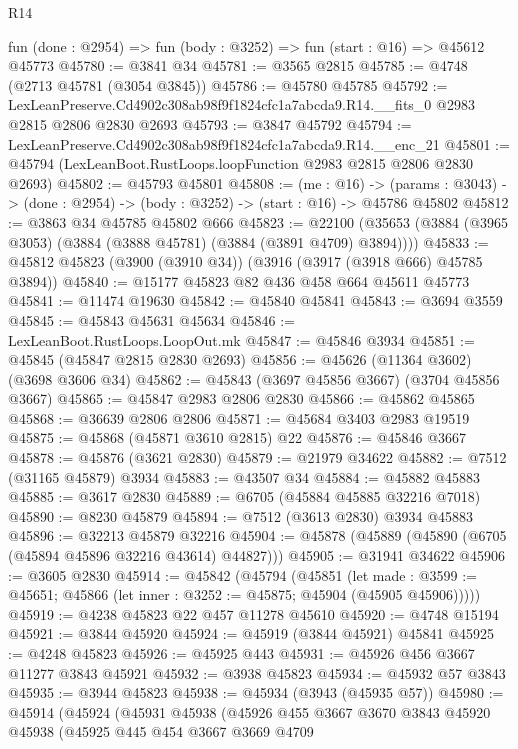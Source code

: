 \begin{lexlean}{R14}
\begin{coremodule}
  fun (done : @2954) => fun (body : @3252) => fun (start : @16) => @45612 @45773
@45780 := @3841 @34
@45781 := @3565 @2815
@45785 := @4748 (@2713 @45781 (@3054 @3845))
@45786 := @45780 @45785
@45792 := LexLeanPreserve.Cd4902c308ab98f9f1824cfc1a7abcda9.R14.__fits_0
    @2983
    @2815
    @2806
    @2830
    @2693
@45793 := @3847 @45792
@45794 := LexLeanPreserve.Cd4902c308ab98f9f1824cfc1a7abcda9.R14.__enc_21
@45801 := @45794 (LexLeanBoot.RustLoops.loopFunction @2983 @2815 @2806 @2830 @2693)
@45802 := @45793 @45801
@45808 := (me : @16) ->
  (params : @3043) -> (done : @2954) -> (body : @3252) -> (start : @16) -> @45786 @45802
@45812 := @3863 @34 @45785 @45802 @666
@45823 := @22100 (@35653 (@3884 (@3965 @3053) (@3884 (@3888 @45781) (@3884 (@3891 @4709) @3894))))
@45833 := @45812 @45823 (@3900 (@3910 @34)) (@3916 (@3917 (@3918 @666) @45785 @3894))
@45840 := @15177 @45823 @82 @436 @458 @664 @45611 @45773
@45841 := @11474 @19630
@45842 := @45840 @45841
@45843 := @3694 @3559
@45845 := @45843 @45631 @45634
@45846 := LexLeanBoot.RustLoops.LoopOut.mk
@45847 := @45846 @3934
@45851 := @45845 (@45847 @2815 @2830 @2693)
@45856 := @45626 (@11364 @3602) (@3698 @3606 @34)
@45862 := @45843 (@3697 @45856 @3667) (@3704 @45856 @3667)
@45865 := @45847 @2983 @2806 @2830
@45866 := @45862 @45865
@45868 := @36639 @2806 @2806
@45871 := @45684 @3403 @2983 @19519
@45875 := @45868 (@45871 @3610 @2815) @22
@45876 := @45846 @3667
@45878 := @45876 (@3621 @2830)
@45879 := @21979 @34622
@45882 := @7512 (@31165 @45879) @3934
@45883 := @43507 @34
@45884 := @45882 @45883
@45885 := @3617 @2830
@45889 := @6705 (@45884 @45885 @32216 @7018)
@45890 := @8230 @45879
@45894 := @7512 (@3613 @2830) @3934 @45883
@45896 := @32213 @45879 @32216
@45904 := @45878 (@45889 (@45890 (@6705 (@45894 @45896 @32216 @43614) @44827)))
@45905 := @31941 @34622
@45906 := @3605 @2830
@45914 := @45842
    (@45794
      (@45851
        (let made : @3599 := @45651; @45866 (let inner : @3252 := @45875; @45904 (@45905 @45906)))))
@45919 := @4238 @45823 @22 @457 @11278 @45610
@45920 := @4748 @15194
@45921 := @3844 @45920
@45924 := @45919 (@3844 @45921) @45841
@45925 := @4248 @45823
@45926 := @45925 @443
@45931 := @45926 @456 @3667 @11277 @3843 @45921
@45932 := @3938 @45823
@45934 := @45932 @57 @3843
@45935 := @3944 @45823
@45938 := @45934 (@3943 (@45935 @57))
@45980 := @45914
    (@45924
      (@45931
        @45938
        (@45926
          @455
          @3667
          @3670
          @3843
          @45920
          @45938
          (@45925
            @445
            @454
            @3667
            @3669
            @4709

\end{coremodule}
\end{lexlean}
